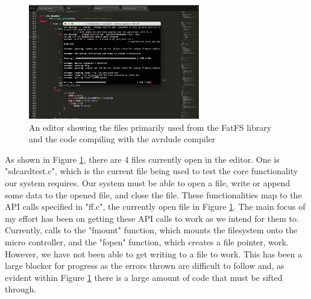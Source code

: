 \documentclass[letterpaper,10pt]{article}
\begin{document}
\begin{figure}[H]
\begin{center}
\includegraphics[height=5cm,width=\linewidth,keepaspectratio]{code.png}
\caption{An editor showing the files primarily used from the FatFS library and the code compiling with the avrdude compiler}
\label{fig:code}
\end{center}
\end{figure}
As shown in Figure \ref{fig:code}, there are 4 files currently open in the editor. One is "sdcardtest.c", 
which is the current file being used to test the core functionality our system requires. Our system must 
be able to open a file, write or append some data to the opened file, and close the file. 
These functionalities map to the API calls specified in "ff.c", the currently open file in Figure 
\ref{fig:code}. The main focus of my effort has been on getting these API calls to work as we intend
for them to. Currently, calls to the "fmount" function, which mounts the filesystem onto the micro
controller, and the "fopen" function, which creates a file pointer, work. However, we have not
been able to get writing to a file to work. This has been a large blocker for progress as the errors thrown
are difficult to follow and, as evident within Figure \ref{fig:code} there is a large amount of code that
must be sifted through.
\end{document}
